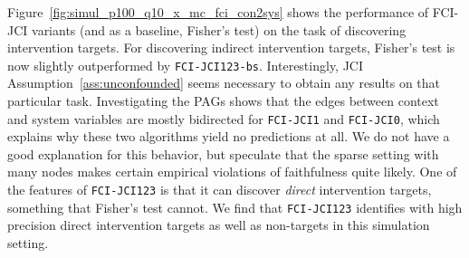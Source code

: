 \documentclass[twoside,11pt]{article}
\newcommand{\alg}[1]{\texttt{#1}}
\newcommand{\boldcap}[1]{\textbf{#1}}
\newcommand{\Joris}[1]{{\color{blue}#1}}
\begin{document}
\begin{comment}
\begin{figure}[t]
\centerline{%
\texttt{[image: \{linear\_stochastic\_100\_10\_0.02\_0.02\_100\_1\_0\_ROC\_con2sys\_arel\_fci]}.png}
\texttt{[image: \{linear\_stochastic\_100\_10\_0.02\_0.02\_100\_1\_0\_PR1\_con2sys\_arel\_fci\_zoom]}.png}
\texttt{[image: \{linear\_stochastic\_100\_10\_0.02\_0.02\_100\_1\_0\_PR0\_con2sys\_arel\_fci\_zoom]}.png}
\texttt{[image: \{linear\_stochastic\_100\_10\_0.02\_0.02\_100\_1\_0\_LEG\_con2sys\_arel\_fci]}.png}
}
\centerline{%
\texttt{[image: \{linear\_stochastic\_100\_10\_0.02\_0.02\_100\_1\_0\_ROC\_con2sys\_edge\_dit]}.png}
\texttt{[image: \{linear\_stochastic\_100\_10\_0.02\_0.02\_100\_1\_0\_PR1\_con2sys\_edge\_dit\_zoom]}.png}
\texttt{[image: \{linear\_stochastic\_100\_10\_0.02\_0.02\_100\_1\_0\_PR0\_con2sys\_edge\_dit\_zoom]}.png}
\texttt{[image: \{linear\_stochastic\_100\_10\_0.02\_0.02\_100\_1\_0\_LEG\_con2sys\_edge\_dit]}.png}
}
\caption{\boldcap{Results for discovering intervention targets} in large models WITH STANDARD TEST. Top: indirect intervention targets; Bottom: direct intervention targets. Note that we zoomed in on the PR curves.\label{fig:simul_p100_q10_x_mc_fci_con2sys}}
\end{figure}
\end{comment}

Figure~\ref{fig:simul_p100_q10_x_mc_fci_con2sys} shows the performance of FCI-JCI variants (and as a baseline,
Fisher's test) on the task of discovering intervention targets.
For discovering indirect intervention targets, Fisher's test is now slightly outperformed by \alg{FCI-JCI123-bs}. 
Interestingly, JCI Assumption~\ref{ass:unconfounded} seems necessary to obtain any results on that particular task.
Investigating the PAGs shows that the edges between context and system variables are mostly bidirected
for \alg{FCI-JCI1} and \alg{FCI-JCI0}, which explains why these two algorithms yield no predictions at all.
We do not have a good explanation for this behavior, but speculate that the sparse setting with many nodes makes
certain empirical violations of faithfulness quite likely. 
One of the features of \alg{FCI-JCI123} is that it can discover \emph{direct} intervention targets, something
that Fisher's test cannot.
We find that \alg{FCI-JCI123} identifies with high precision direct intervention targets as well as non-targets in this simulation setting.
\end{document}
